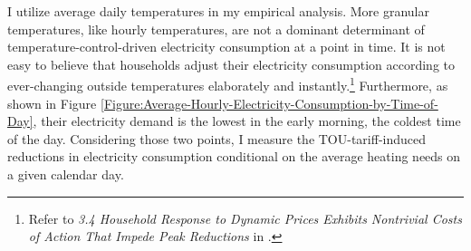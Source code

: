 I utilize average daily temperatures in my empirical analysis. More granular temperatures, like hourly temperatures, are not a dominant determinant of temperature-control-driven electricity consumption at a point in time. It is not easy to believe that households adjust their electricity consumption according to ever-changing outside temperatures elaborately and instantly.\footnote{Refer to \textit{3.4 Household Response to Dynamic Prices Exhibits Nontrivial Costs of Action That Impede Peak Reductions} in \cite{Household-Responses-to-Time-Varying-Electricity-Prices_Harding-and-Sexton_2017}.} Furthermore, as shown in Figure \ref{Figure:Average-Hourly-Electricity-Consumption-by-Time-of-Day}, their electricity demand is the lowest in the early morning, the coldest time of the day. Considering those two points, I measure the TOU-tariff-induced reductions in electricity consumption conditional on the average heating needs on a given calendar day. 

